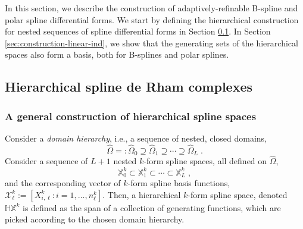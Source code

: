 \documentclass[10pt]{article}
\newcommand{\basis}[1]{\mathcal{#1}}
\newcommand{\vSpace}[1]{\mathbb{#1}}
\newcommand{\tpDomain}{\widehat{\Omega}}
\newcommand{\hSpace}[1]{\mathit{\vSpace{H}\vSpace{#1}}}
\theoremstyle{plain}
\theoremstyle{definition}
\theoremstyle{remark}
\begin{document}
In this section, we describe the construction of adaptively-refinable B-spline and polar spline differential forms.
We start by defining the hierarchical construction for nested sequences of spline differential forms in Section \ref{sec:construction-hierarchical}.
In Section \ref{sec:construction-linear-ind}, we show that the generating sets of the hierarchical spaces also form a basis, both for B-splines and polar splines.

\subsection{Hierarchical spline de Rham complexes}
\label{sec:construction-hierarchical}

\subsubsection{A general construction of hierarchical spline spaces}
\label{sec:construction-hierarchical-general}

Consider a \emph{domain hierarchy}, i.e., a sequence of nested, closed domains,
\begin{equation}
    \tpDomain =: \tpDomain_0\supseteq \tpDomain_1 \supseteq \cdots \supseteq \tpDomain_{L}\;.
\end{equation}
Consider a sequence of $L+1$ nested $k$-form spline spaces, all defined on $\tpDomain$,
\begin{equation}
    \vSpace{X}_0^k \subset \vSpace{X}_1^k \subset \cdots \subset \vSpace{X}_L^k\;,
\end{equation}
and the corresponding vector of $k$-form spline basis functions, $\basis{X}^k_\ell := [X^k_{i,\ell} : i = 1, \dots, n^k_\ell]$.
Then, a hierarchical $k$-form spline space, denoted $\hSpace{X}^k$ is defined as the span of a collection of generating functions, which are picked according to the chosen domain hierarchy.
\end{document}
